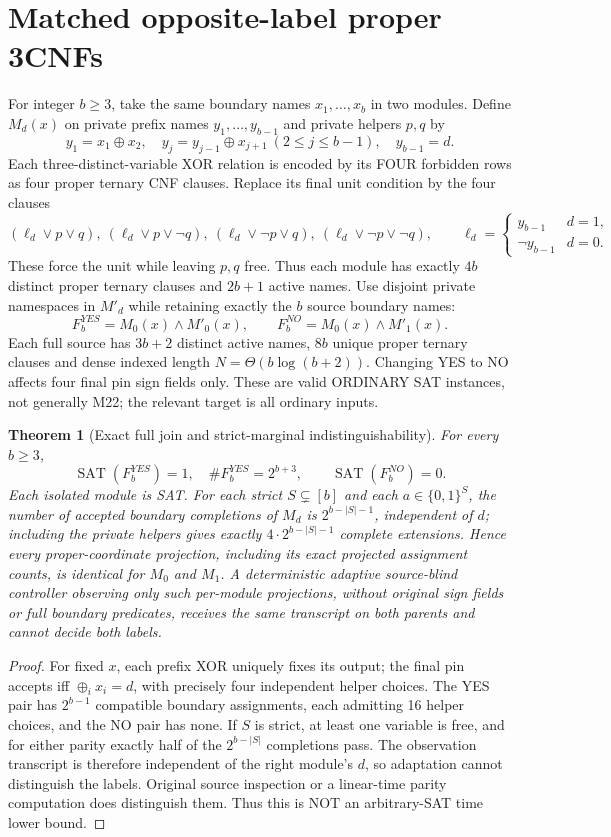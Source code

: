 \documentclass[11pt]{article}
\newtheorem{theorem}{Theorem}
\newcommand{\SAT}{\operatorname{SAT}}
\begin{document}
\section{Matched opposite-label proper 3CNFs}
For integer $b\ge3$, take the same boundary names $x_1,\ldots,x_b$ in two modules. Define $M_d(x)$ on private prefix names $y_1,\ldots,y_{b-1}$ and private helpers $p,q$ by
\[
 y_1=x_1\oplus x_2,\quad
 y_j=y_{j-1}\oplus x_{j+1}\ (2\le j\le b-1),\quad
 y_{b-1}=d.
\]
Each three-distinct-variable XOR relation is encoded by its FOUR forbidden rows as four proper ternary CNF clauses. Replace its final unit condition by the four clauses
\[
 (\ell_d\vee p\vee q),\
 (\ell_d\vee p\vee\neg q),\
 (\ell_d\vee\neg p\vee q),\
 (\ell_d\vee\neg p\vee\neg q),
 \qquad \ell_d=\begin{cases}y_{b-1}&d=1,\\\neg y_{b-1}&d=0.\end{cases}
\]
These force the unit while leaving $p,q$ free. Thus each module has exactly $4b$ distinct proper ternary clauses and $2b+1$ active names. Use disjoint private namespaces in $M'_d$ while retaining exactly the $b$ source boundary names:
\[
 F_b^{YES}=M_0(x)\wedge M'_0(x),\qquad
 F_b^{NO}=M_0(x)\wedge M'_1(x).
\]
Each full source has $3b+2$ distinct active names, $8b$ unique proper ternary clauses and dense indexed length $N=\Theta(b\log(b+2))$. Changing YES to NO affects four final pin sign fields only. These are valid ORDINARY SAT instances, not generally M22; the relevant target is all ordinary inputs.

\begin{theorem}[Exact full join and strict-marginal indistinguishability]\label{th:join}
For every $b\ge3$,
\[
 \SAT(F_b^{YES})=1,\quad \#F_b^{YES}=2^{b+3},\qquad
 \SAT(F_b^{NO})=0.
\]
Each isolated module is SAT. For each strict $S\subsetneq[b]$ and each $a\in\{0,1\}^{S}$, the number of accepted boundary completions of $M_d$ is $2^{b-|S|-1}$, independent of $d$; including the private helpers gives exactly $4\cdot 2^{b-|S|-1}$ complete extensions. Hence every proper-coordinate projection, including its exact projected assignment counts, is identical for $M_0$ and $M_1$. A deterministic adaptive source-blind controller observing only such per-module projections, without original sign fields or full boundary predicates, receives the same transcript on both parents and cannot decide both labels.
\end{theorem}
\begin{proof}
For fixed $x$, each prefix XOR uniquely fixes its output; the final pin accepts iff $\oplus_i x_i=d$, with precisely four independent helper choices. The YES pair has $2^{b-1}$ compatible boundary assignments, each admitting 16 helper choices, and the NO pair has none. If $S$ is strict, at least one variable is free, and for either parity exactly half of the $2^{b-|S|}$ completions pass. The observation transcript is therefore independent of the right module's $d$, so adaptation cannot distinguish the labels. Original source inspection or a linear-time parity computation does distinguish them. Thus this is NOT an arbitrary-SAT time lower bound.
\end{proof}
\end{document}
